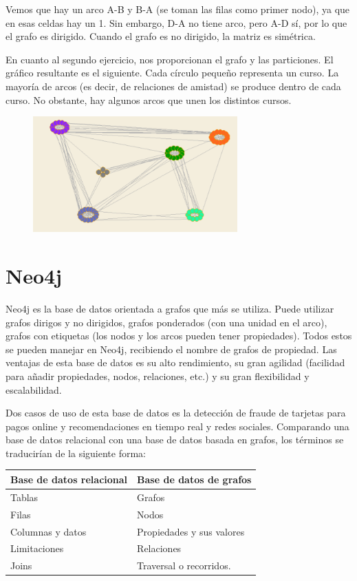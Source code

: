 Vemos que hay un arco A-B y B-A (se toman las filas como primer nodo), ya que en esas celdas hay un 1. Sin embargo, D-A no tiene arco, pero A-D sí, por lo que el grafo es dirigido. Cuando el grafo es no dirigido, la matriz es simétrica.

En cuanto al segundo ejercicio, nos proporcionan el grafo y las particiones. El gráfico resultante es el siguiente. Cada círculo pequeño representa un curso. La mayoría de arcos (es decir, de relaciones de amistad) se produce dentro de cada curso. No obstante, hay algunos arcos que unen los distintos cursos.
\begin{figure}[htbp]
\centering
\includegraphics[width = 0.7\textwidth]{figs/pajek-ex2.png}
\end{figure}

\section{Neo4j}
Neo4j es la base de datos orientada a grafos que más se utiliza. Puede utilizar grafos dirigos y no dirigidos, grafos ponderados (con una unidad en el arco), grafos con etiquetas (los nodos y los arcos pueden tener propiedades). Todos estos se pueden manejar en Neo4j, recibiendo el nombre de grafos de propiedad. Las ventajas de esta base de datos es su alto rendimiento, su gran agilidad (facilidad para añadir propiedades, nodos, relaciones, etc.) y su gran flexibilidad y escalabilidad. 

Dos casos de uso de esta base de datos es la detección de fraude de tarjetas para pagos online y recomendaciones en tiempo real y redes sociales. Comparando una base de datos relacional con una base de datos basada en grafos, los términos se traducirían de la siguiente forma:
\begin{table}[htbp]
\centering
\begin{tabular}{l l}
Base de datos relacional & Base de datos de grafos \\ \hline
Tablas & Grafos \\
Filas & Nodos \\
Columnas y datos & Propiedades y sus valores \\
Limitaciones & Relaciones \\
Joins & Traversal o recorridos.
\end{tabular}
\end{table}

